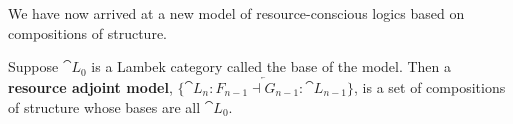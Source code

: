 We have now arrived at a new model of resource-conscious logics based
on compositions of structure.
\begin{definition}
  \label{def:resource-adjoint-model}
  Suppose $\cat{L}_0$ is a Lambek category called the base of the
  model.  Then a \textbf{resource adjoint model},
  $\{\overleftarrow{\cat{L}_n : F_{n-1} \dashv G_{n-1} : \cat{L}_{n-1}}\}$,
  is a set of compositions of structure whose bases are all $\cat{L}_0$.
\end{definition}



